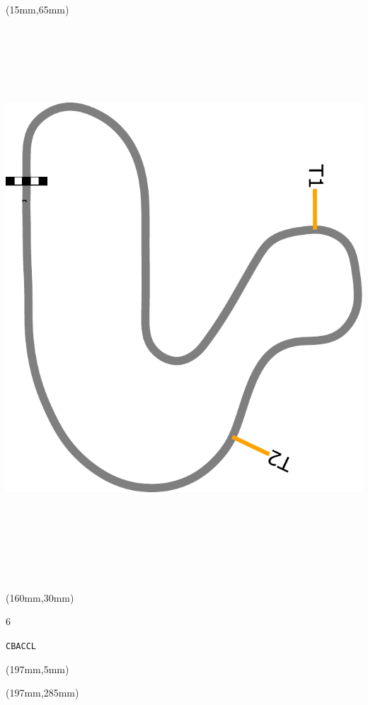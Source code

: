 \begin{textblock*}{185mm}(15mm,65mm)%
\centering
\mbox{\includegraphics[width=185mm,height=210mm,keepaspectratio]{PT/CBACCL.pdf}}
\end{textblock*}
\begin{textblock*}{40mm}(160mm,30mm)%
\Large
\par{} 
\par6 
\par\hfill\tiny\tt CBACCL\\
\end{textblock*}
\begin{textblock*}{20mm}(197mm,5mm)%
\fbox{\thepage}
\label{CBACCL}
\end{textblock*}
\begin{textblock*}{20mm}(197mm,285mm)%
\fbox{\thepage}
\end{textblock*}

